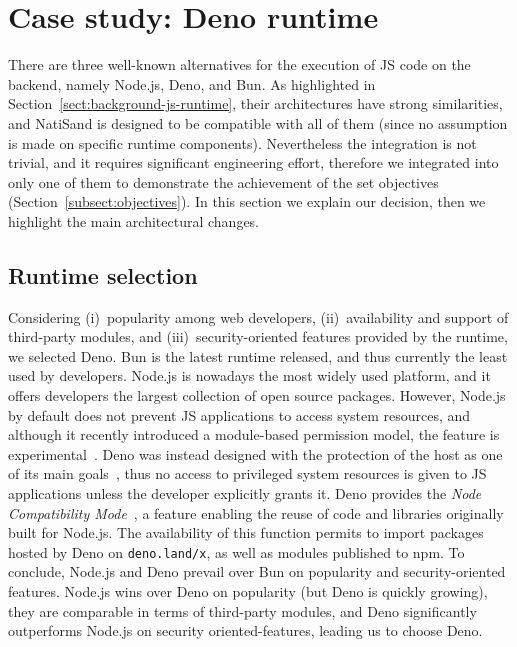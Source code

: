 \section{Case study: Deno runtime}
\label{sect:case-study-deno}

There are three well-known alternatives for the execution of JS code
on the backend, namely Node.js, Deno, and Bun. As highlighted in
Section~\ref{sect:background-js-runtime}, their architectures have
strong similarities, and NatiSand is designed to be compatible with
all of them (since no assumption is made on specific runtime
components). Nevertheless the integration is not trivial, and it requires
significant engineering effort, therefore we integrated \natisand into only
one of them to demonstrate the achievement of the set objectives
(Section~\ref{subsect:objectives}). In this section we explain our
decision, then we highlight the main architectural changes.

\subsection{Runtime selection}
\label{sect:deno-selection}

Considering (i)~popularity among web developers, (ii)~availability and
support of third-party modules, and (iii)~security-oriented features
provided by the runtime, we selected Deno. Bun is the latest runtime
released, and thus currently the least used by developers. Node.js is nowadays the most
widely used platform, and it offers developers the largest collection
of open source packages. However, Node.js by default does not prevent
JS applications to access system resources, and although it
recently introduced a module-based permission model, the feature is
experimental~\cite{node-permissions}. Deno was instead designed with the protection of
the host as one of its main goals~\cite{nodejs-regret}, thus no access to privileged system
resources is given to JS applications unless the developer
explicitly grants it. Deno provides the
{\em Node Compatibility Mode}~\cite{deno-compatibility-mode}, a
feature enabling the reuse of
code and libraries originally built for Node.js. The availability of
this function permits to
import packages hosted by Deno on {\tt deno.land/x}, as well as
modules published to npm. To conclude, Node.js and Deno prevail
over Bun on popularity and security-oriented features. Node.js wins over Deno on
popularity (but Deno is quickly growing), they are comparable in terms
of third-party modules, and Deno significantly outperforms Node.js on
security oriented-features, leading us to choose Deno.

